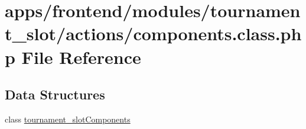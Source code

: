 \hypertarget{frontend_2modules_2tournament__slot_2actions_2components_8class_8php}{\section{apps/frontend/modules/tournament\-\_\-slot/actions/components.class.\-php File Reference}
\label{frontend_2modules_2tournament__slot_2actions_2components_8class_8php}
}
\subsection*{Data Structures}
\begin{DoxyCompactItemize}
\item 
class \hyperlink{classtournament__slot_components}{tournament\-\_\-slot\-Components}
\end{DoxyCompactItemize}

